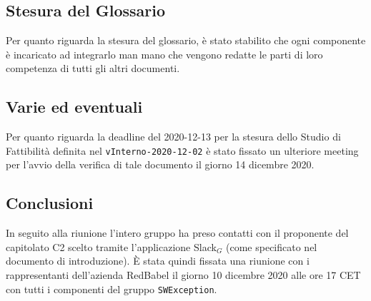 	\subsection{Stesura del Glossario}
	Per quanto riguarda la stesura del glossario, è stato stabilito che ogni componente è incaricato ad integrarlo man mano che vengono redatte le parti di loro competenza di tutti gli altri documenti.
	
	\subsection{Varie ed eventuali}
	Per quanto riguarda la deadline del 2020-12-13 per la stesura dello Studio di Fattibilità definita nel \verb|vInterno-2020-12-02| è stato fissato un ulteriore meeting per l'avvio della verifica di tale documento il giorno 14 dicembre 2020.
	
	\subsection{Conclusioni}
	In seguito alla riunione l'intero gruppo ha preso contatti con il proponente del capitolato C2 scelto tramite l'applicazione Slack$_G$ (come specificato nel documento di introduzione). È stata quindi fissata una riunione con i rappresentanti dell'azienda RedBabel il giorno 10 dicembre 2020 alle ore 17 CET con tutti i componenti del gruppo \verb|SWException|.
	